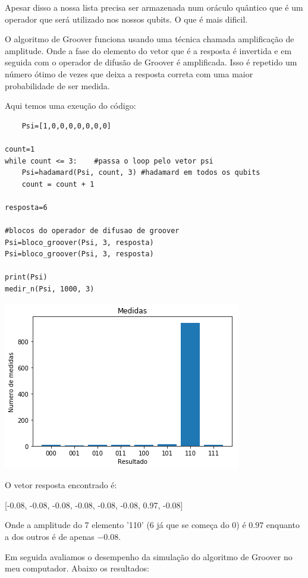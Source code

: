 \documentclass[12pt,a4paper]{article}
\begin{document}
Apesar disso a nossa lista precisa ser armazenada num oráculo quântico que é um operador que será utilizado nos nossos qubits. O que é mais dificil.


O algoritmo de Groover funciona usando uma técnica chamada amplificação de amplitude. Onde a fase do elemento do vetor que é a resposta é invertida e em seguida com o operador de difusão de Groover é amplificada. Isso é repetido um número ótimo de vezes que deixa a resposta correta com uma maior probabilidade de ser medida.

Aqui temos uma exeução do código:
\begin{verbatim}
    Psi=[1,0,0,0,0,0,0,0]

count=1
while count <= 3:    #passa o loop pelo vetor psi
    Psi=hadamard(Psi, count, 3) #hadamard em todos os qubits
    count = count + 1

resposta=6

#blocos do operador de difusao de groover
Psi=bloco_groover(Psi, 3, resposta)
Psi=bloco_groover(Psi, 3, resposta)

print(Psi)
medir_n(Psi, 1000, 3)
\end{verbatim}

\includegraphics[]{relatorio_groover.png}


O vetor resposta encontrado é:


[-0.08, -0.08, -0.08, -0.08, -0.08, -0.08, 0.97, -0.08]

Onde a amplitude do 7 elemento '110' (6  já que se começa do 0) é $0.97$ enquanto a dos outros é de apenas $-0.08$.


Em seguida avaliamos o desempenho da simulação do algoritmo de Groover no meu computador. Abaixo os resultados:
\end{document}

